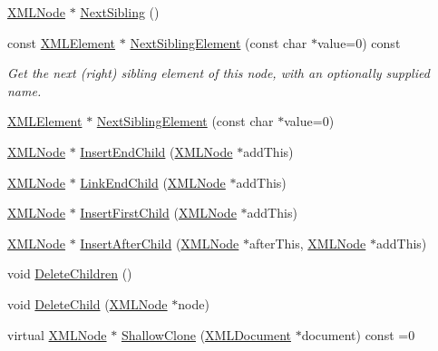 \begin{DoxyCompactItemize}
\hyperlink{classtinyxml2_1_1_x_m_l_node}{X\-M\-L\-Node} $\ast$ \hyperlink{classtinyxml2_1_1_x_m_l_node_aeb7d4dfd8fb924ef86e7cb72183acbac}{Next\-Sibling} ()
\item 
const \hyperlink{classtinyxml2_1_1_x_m_l_element}{X\-M\-L\-Element} $\ast$ \hyperlink{classtinyxml2_1_1_x_m_l_node_a490e166c3a1c6607960bfa9c112d3d30}{Next\-Sibling\-Element} (const char $\ast$value=0) const 
\begin{DoxyCompactList}\small\item\em Get the next (right) sibling element of this node, with an optionally supplied name. \end{DoxyCompactList}\item 
\hyperlink{classtinyxml2_1_1_x_m_l_element}{X\-M\-L\-Element} $\ast$ \hyperlink{classtinyxml2_1_1_x_m_l_node_acf735bf653016792522305d8ad4b3029}{Next\-Sibling\-Element} (const char $\ast$value=0)
\item 
\hyperlink{classtinyxml2_1_1_x_m_l_node}{X\-M\-L\-Node} $\ast$ \hyperlink{classtinyxml2_1_1_x_m_l_node_ae3b422e98914d6002ca99bb1d2837103}{Insert\-End\-Child} (\hyperlink{classtinyxml2_1_1_x_m_l_node}{X\-M\-L\-Node} $\ast$add\-This)
\item 
\hyperlink{classtinyxml2_1_1_x_m_l_node}{X\-M\-L\-Node} $\ast$ \hyperlink{classtinyxml2_1_1_x_m_l_node_a663e3a5a378169fd477378f4d17a7649}{Link\-End\-Child} (\hyperlink{classtinyxml2_1_1_x_m_l_node}{X\-M\-L\-Node} $\ast$add\-This)
\item 
\hyperlink{classtinyxml2_1_1_x_m_l_node}{X\-M\-L\-Node} $\ast$ \hyperlink{classtinyxml2_1_1_x_m_l_node_ac609a8f3ea949027f439280c640bbaf2}{Insert\-First\-Child} (\hyperlink{classtinyxml2_1_1_x_m_l_node}{X\-M\-L\-Node} $\ast$add\-This)
\item 
\hyperlink{classtinyxml2_1_1_x_m_l_node}{X\-M\-L\-Node} $\ast$ \hyperlink{classtinyxml2_1_1_x_m_l_node_a9275138a1b8dd5d8e2c26789bdc23ac8}{Insert\-After\-Child} (\hyperlink{classtinyxml2_1_1_x_m_l_node}{X\-M\-L\-Node} $\ast$after\-This, \hyperlink{classtinyxml2_1_1_x_m_l_node}{X\-M\-L\-Node} $\ast$add\-This)
\item 
void \hyperlink{classtinyxml2_1_1_x_m_l_node_a0360085cc54df5bff85d5c5da13afdce}{Delete\-Children} ()
\item 
void \hyperlink{classtinyxml2_1_1_x_m_l_node_a363b6edbd6ebd55f8387d2b89f2b0921}{Delete\-Child} (\hyperlink{classtinyxml2_1_1_x_m_l_node}{X\-M\-L\-Node} $\ast$node)
\item 
virtual \hyperlink{classtinyxml2_1_1_x_m_l_node}{X\-M\-L\-Node} $\ast$ \hyperlink{classtinyxml2_1_1_x_m_l_node_a8402cbd3129d20e9e6024bbcc0531283}{Shallow\-Clone} (\hyperlink{classtinyxml2_1_1_x_m_l_document}{X\-M\-L\-Document} $\ast$document) const =0

\end{DoxyCompactItemize}
